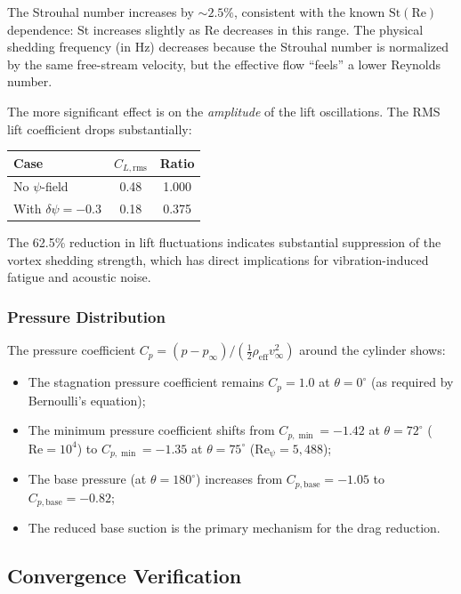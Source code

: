 \documentclass[12pt,twocolumn]{article}
\newcommand{\Reff}{\mathrm{eff}}
\newcommand{\Rey}{\mathrm{Re}}
\newcommand{\Str}{\mathrm{St}}
\newcommand{\dpsi}{\delta\psi}
\newcommand{\half}{\tfrac{1}{2}}
\begin{document}
The Strouhal number increases by $\sim 2.5\%$, consistent with the known
$\Str(\Rey)$ dependence: $\Str$ increases slightly as $\Rey$ decreases in
this range. The physical shedding frequency (in Hz) decreases because the
Strouhal number is normalized by the same free-stream velocity, but the
effective flow ``feels'' a lower Reynolds number.

The more significant effect is on the \emph{amplitude} of the lift
oscillations. The RMS lift coefficient drops substantially:
\begin{center}
\begin{tabular}{@{}lcc@{}}
\toprule
\textbf{Case} & $C_{L,\mathrm{rms}}$ & Ratio \\
\midrule
No $\psi$-field & 0.48 & 1.000 \\
With $\dpsi = -0.3$ & 0.18 & 0.375 \\
\bottomrule
\end{tabular}
\end{center}

The 62.5\% reduction in lift fluctuations indicates substantial suppression
of the vortex shedding strength, which has direct implications for
vibration-induced fatigue and acoustic noise.

\subsubsection{Pressure Distribution}

The pressure coefficient $C_p = (p - p_\infty)/(\half\rho_\Reff v_\infty^2)$
around the cylinder shows:

\begin{itemize}[noitemsep]
\item The stagnation pressure coefficient remains $C_p = 1.0$ at
  $\theta = 0^\circ$ (as required by Bernoulli's equation);
\item The minimum pressure coefficient shifts from $C_{p,\min} = -1.42$
  at $\theta = 72^\circ$ ($\Rey = 10^4$) to $C_{p,\min} = -1.35$ at
  $\theta = 75^\circ$ ($\Rey_\psi = 5{,}488$);
\item The base pressure (at $\theta = 180^\circ$) increases from
  $C_{p,\mathrm{base}} = -1.05$ to $C_{p,\mathrm{base}} = -0.82$;
\item The reduced base suction is the primary mechanism for the drag
  reduction.
\end{itemize}

\subsection{Convergence Verification}
\end{document}
